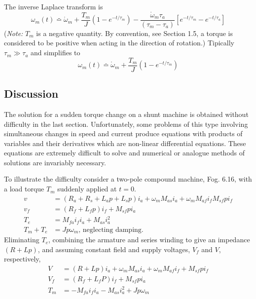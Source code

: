 \documentclass[a4paper,numbers=noenddot,12pt]{scrbook}
\begin{document}
The inverse Laplace transform is
\begin{equation}
    \omega_m(t) \bumpeq \mathring \omega_m + \dfrac{T_m}{J} (1 - e^{-t/\tau_m}) - \dfrac{\mathring \omega_m \tau_a}{(\tau_m - \tau_a)}[e^{-t/\tau_m} - e^{-t / \tau_a}]
    \label{}
\end{equation}
(\textit{Note:} $T_m$ is a negative quantity. By convention, see Section 1.5, a torque is considered to be positive when acting in the direction of rotation.)
Tipically $\tau_m \gg \tau_a$ and simplifies to
\begin{equation}
    \omega_m(t) \bumpeq \mathring \omega_m + \dfrac{T_m}{J}(1 - e^{-t/\tau_m})
    \label{eq:Eq6.73}
\end{equation}
\subsection{Discussion} The solution for a sudden torque change on a shunt machine is obtained without difficulty in the last section. Unfortunately, some problems of this type involving simultaneous changes in speed and current produce equations with products of variables and their derivatives which are non-linear differential equations. These equations are extremely difficult to solve and numerical or analogue methods of solutions are invariably necessary.

To illustrate the difficulty consider a two-pole compound machine, Fog. 6.16, with a load torque $T_m$ suddenly applied at $t = 0$.
\begin{equation}
    \begin{aligned}
        v & =(R_a + R_s +L_a p + L_s p)i_a + \omega_m M_{as} i_a + \omega_m M_{af} i_f M_{sf} p i_f \\
        v_f & = (R_f + L_f p)i_f + M_{sf} p i_a \\
        T_e & = M_{fa} i_f i_a + M_{as}i_a^2 \\
        T_m + T_e & = J p \omega_m \text{, neglecting damping.}
    \end{aligned}
    \label{eq:Eq6.74}
\end{equation}
Eliminating $T_e$, combining the armature and series winding to give an impedance $(R + Lp)$, and assuming constant field and supply voltages, $V_f$ and $V$, respectively,
\begin{equation}
    \begin{aligned}
        V & =(R + L p)i_a + \omega_m M_{as} i_a + \omega_m M_{af}i_f + M_{sf} p i_f \\
        V_f & = (R_f +L_f P)i_f + M_{sf} p i_a \\
        T_m & = - M_{fa} i_f i_a - M_{as} i_a^2 + J p \omega_m
    \end{aligned}
    \label{eq:Eq6.75}
\end{equation}
\end{document}
